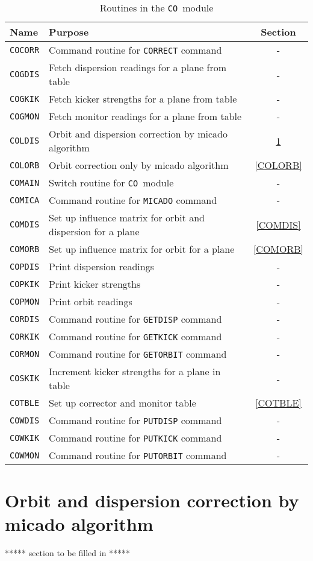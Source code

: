 \begin{table}[h]
\centering
\caption{Routines in the {\tt CO}~module}
\label{T-CO}
\vspace{1ex}
\begin{tabular}{|l|p{}|c|}
\hline
Name&Purpose&Section\\
\hline
\tt COCORR&Command routine for {\tt CORRECT} command&-\\
\tt COGDIS&Fetch dispersion readings for a plane from table&-\\
\tt COGKIK&Fetch kicker strengths for a plane from table&-\\
\tt COGMON&Fetch monitor readings for a plane from table&-\\
\tt COLDIS&Orbit and dispersion correction by micado algorithm&
  \ref{COLDIS}\\
\tt COLORB&Orbit correction only by micado algorithm&\ref{COLORB}\\
\tt COMAIN&Switch routine for {\tt CO}~module&-\\
\tt COMICA&Command routine for {\tt MICADO} command&-\\
\tt COMDIS&Set up influence matrix for orbit and dispersion for
  a plane&\ref{COMDIS}\\
\tt COMORB&Set up influence matrix for orbit for a plane&\ref{COMORB}\\
\tt COPDIS&Print dispersion readings&-\\
\tt COPKIK&Print kicker strengths&-\\
\tt COPMON&Print orbit readings&-\\
\tt CORDIS&Command routine for {\tt GETDISP} command&-\\
\tt CORKIK&Command routine for {\tt GETKICK} command&-\\
\tt CORMON&Command routine for {\tt GETORBIT} command&-\\
\tt COSKIK&Increment kicker strengths for a plane in table&-\\
\tt COTBLE&Set up corrector and monitor table&\ref{COTBLE}\\
\tt COWDIS&Command routine for {\tt PUTDISP} command&-\\
\tt COWKIK&Command routine for {\tt PUTKICK} command&-\\
\tt COWMON&Command routine for {\tt PUTORBIT} command&-\\
\hline
\end{tabular}
\end{table}

\section{Orbit and dispersion correction by micado algorithm}
\label{COLDIS}
***** section to be filled in *****

